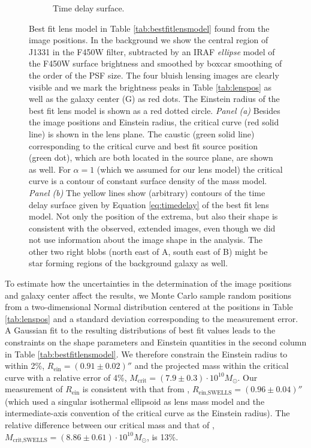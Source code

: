 \begin{figure}
\begin{subfigure}{.5\textwidth}
  \caption{Time delay surface.}
  \label{fig:lensbestfittimedelay}
\end{subfigure}
\caption{Best fit lens model in Table \ref{tab:bestfitlensmodel} found from the image positions. In the background we show the central region of J1331 in the F450W filter, subtracted by an IRAF \emph{ellipse} model of the F450W surface brightness and smoothed by boxcar smoothing of the order of the PSF size. The four bluish lensing images are clearly visible and we mark the brightness peaks in Table \ref{tab:lenspos} as well as the galaxy center (G) as red dots. The Einstein radius of the best fit lens model is shown as a red dotted circle. \emph{Panel (a)} Besides the image positions and Einstein radius, the critical curve (red solid line) is shown in the lens plane. The caustic (green solid line) corresponding to the critical curve and best fit source position (green dot), which are both located in the source plane, are shown as well. For $\alpha=1$ (which we assumed for our lens model) the critical curve is a contour of constant surface density of the mass model. \emph{Panel (b)} The yellow lines show (arbitrary) contours of the time delay surface given by Equation \eqref{eq:timedelay} of the best fit lens model. Not only the position of the extrema, but also their shape is consistent with the observed, extended images, even though we did not use information about the image shape in the analysis. The other two right blobs (north east of A, south east of B) might be star forming regions of the background galaxy as well.  }
\label{fig:???}
\end{figure}


To estimate how the uncertainties in the determination of the image positions and galaxy center affect the results, we Monte Carlo sample random positions from a two-dimensional Normal distribution centered at the positions in Table \ref{tab:lenspos} and a standard deviation corresponding to the measurement error. A Gaussian fit to the resulting distributions of best fit values leads to the constraints on the shape parameters and Einstein quantities in the second column in Table \ref{tab:bestfitlensmodel}. We therefore constrain the Einstein radius to within 2\%, $R_\text{ein} = (0.91 \pm 0.02)''$ and the projected mass within the critical curve with a relative error of 4\%, $M_\text{crit} =(7.9\pm0.3)\cdot 10^{10} M_\odot$. Our measurement of $R_\text{ein}$ is consistent with that from \citet{SWELLSIII}, $R_\text{ein,SWELLS} = (0.96 \pm 0.04)''$ (which used a singular isothermal ellipsoid as lens mass model and the intermediate-axis convention of the critical curve as the Einstein radius). The relative difference between our critical mass and that of \citet{SWELLSIII}, $M_\text{crit,SWELLS} =(8.86\pm0.61)\cdot 10^{10} M_\odot$, is 13\%.

